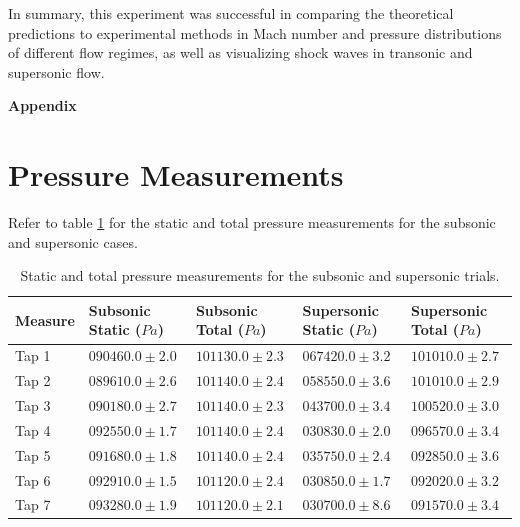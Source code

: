 \documentclass[runningheads]{llncs}
\begin{document}
\noindent
In summary, this experiment was successful in comparing the theoretical predictions to experimental methods in Mach number and pressure distributions of different flow regimes, as well as visualizing shock waves in transonic and supersonic flow. \newline






\newpage






\newpage
\appendix
\noindent
{\LARGE \textbf{Appendix}}

\section{Pressure Measurements}

Refer to table \ref{tab:pressure_data} for the static and total pressure measurements for the subsonic and supersonic cases.

\begin{table}[h]
    \centering
    \begin{tabular}{p{2cm}p{3.5cm}p{3.5cm}p{3.5cm}p{3.5cm}}
        \toprule
        Measure & Subsonic Static ($\si{Pa}$) & Subsonic Total ($\si{Pa}$) & Supersonic Static ($\si{Pa}$) & Supersonic Total ($\si{Pa}$) \\
        \midrule
        Tap 1 & $090460.0 \pm 2.0$ & $101130.0 \pm 2.3$ & $067420.0 \pm 3.2$ & $101010.0 \pm 2.7$ \\
        Tap 2 & $089610.0 \pm 2.6$ & $101140.0 \pm 2.4$ & $058550.0 \pm 3.6$ & $101010.0 \pm 2.9$ \\
        Tap 3 & $090180.0 \pm 2.7$ & $101140.0 \pm 2.3$ & $043700.0 \pm 3.4$ & $100520.0 \pm 3.0$ \\
        Tap 4 & $092550.0 \pm 1.7$ & $101140.0 \pm 2.4$ & $030830.0 \pm 2.0$ & $096570.0 \pm 3.4$ \\
        Tap 5 & $091680.0 \pm 1.8$ & $101140.0 \pm 2.4$ & $035750.0 \pm 2.4$ & $092850.0 \pm 3.6$ \\
        Tap 6 & $092910.0 \pm 1.5$ & $101120.0 \pm 2.4$ & $030850.0 \pm 1.7$ & $092020.0 \pm 3.2$ \\
        Tap 7 & $093280.0 \pm 1.9$ & $101120.0 \pm 2.1$ & $030700.0 \pm 8.6$ & $091570.0 \pm 3.4$ \\
        \bottomrule
    \end{tabular}
    \caption{Static and total pressure measurements for the subsonic and supersonic trials.}
    \label{tab:pressure_data}
\end{table}
\end{document}
